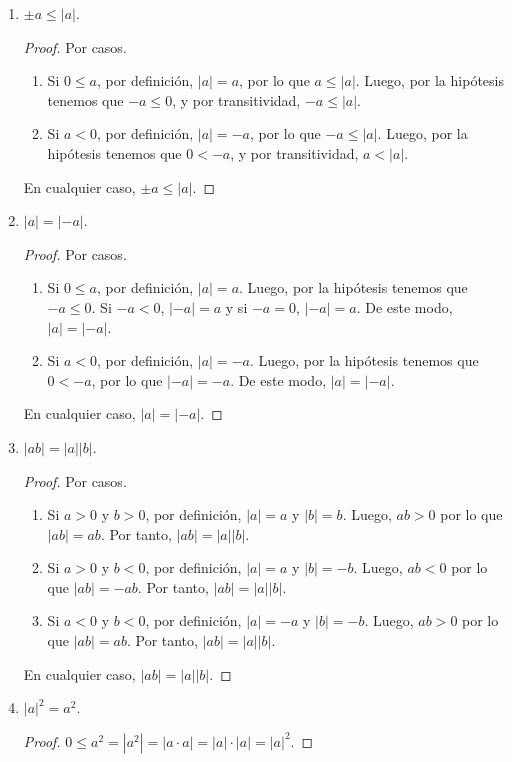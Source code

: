 \documentclass[11pt]{article}
\begin{document}
\begin{enumerate}[label=\alph*)]
\item $\pm a\leq |a|$.

\begin{proof}
 Por casos.
 \begin{enumerate}[label=\roman*)]
  \item Si $0 \leq a$, por definición, $|a|=a$, por lo que $a\leq |a|$. Luego, por la hipótesis tenemos que $-a \leq 0$, y por transitividad, $-a\leq |a|$.
  \item Si $a<0$, por definición, $|a|=-a$, por lo que $-a\leq |a|$. Luego, por la hipótesis tenemos que $0<-a$, y por transitividad, $a<|a|$.
 \end{enumerate}
 En cualquier caso, $\pm a\leq |a|$.
\end{proof} 

\item $|a|=|-a|$.
\begin{proof}
 Por casos.
 \begin{enumerate}[label=\roman*)]
  \item Si $0 \leq a$, por definición, $|a|=a$. Luego, por la hipótesis tenemos que $-a \leq 0$. Si $-a<0$, $|-a|=a$ y si $-a=0$, $|-a|=a$. De este modo, $|a|=|-a|$.
  \item Si $a<0$, por definición, $|a|=-a$. Luego, por la hipótesis tenemos que $0<-a$, por lo que $|-a|=-a$. De este modo, $|a|=|-a|$.
 \end{enumerate}
 En cualquier caso, $|a|=|-a|$.
\end{proof}

\item $|ab|=|a||b|$.

\begin{proof}
 Por casos.
 \begin{enumerate}[label=\roman*)]
  \item Si $a>0$ y $b>0$, por definición, $|a|=a$ y $|b|=b$. Luego, $ab>0$ por lo que $|ab|=ab$. Por tanto, $|ab| =|a||b|$.
  \item Si $a>0$ y $b<0$, por definición, $|a|=a$ y $|b|=-b$. Luego, $ab<0$ por lo que $|ab|=-ab$. Por tanto, $|  ab|=|a||b|$.
  \item Si $a<0$ y $b<0$, por definición, $|a|=-a$ y $|b|=-b$. Luego, $ab>0$ por lo que $|ab|=ab$. Por tanto, $|  ab|=|a||b|$.
 \end{enumerate}
 En cualquier caso, $|ab|=|a||b|$.
\end{proof}

\item $|a|^2=a^2$.
\begin{proof} 
 $0 \leq a^2 = |a^2|= |a\cdot a|=|a| \cdot |a|= |a|^2$. \qedhere
\end{proof}


\end{enumerate}
\end{document}
